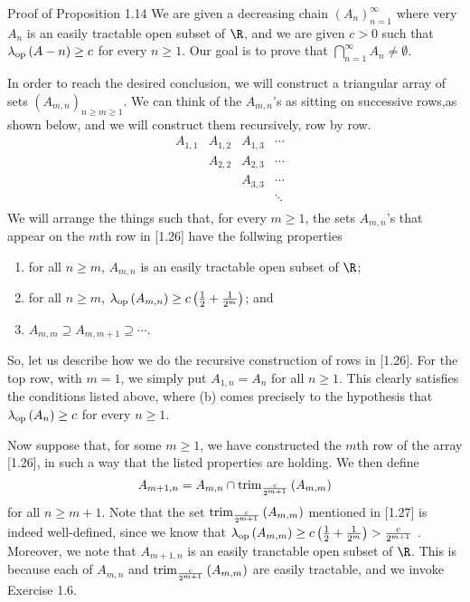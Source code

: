 \documentclass[pmath450]{subfiles}
\begin{document}
    \begin{boxyproof}{Proof of Proposition 1.14}
        We are given a decreasing chain $\left( A_{n} \right)^{\infty}_{n=1}$ where very $A_n$ is an easily tractable open subset of $\R$, and we are given $c>0$ such that $\lambda_{\operatorname{op}}\left( A-n \right)\geq c$ for every $n\geq 1$. Our goal is to prove that $\bigcap^{\infty}_{n=1}A_n\neq\emptyset$.

        In order to reach the desired conclusion, we will construct a triangular array of sets $\left( A_{m,n} \right)^{}_{n\geq m\geq 1}$. We can think of the $A_{m,n}$'s as sitting on successive rows,as shown below, and we will construct them recursively, row by row.
        \begin{equation}
            \begin{matrix}
                A_{1,1} & A_{1,2} & A_{1,3} & \cdots \\
                        & A_{2,2} & A_{2,3} & \cdots \\
                        &  &  A_{3,3} & \cdots \\
                        & & & \ddots & \\
            \end{matrix}
        \end{equation}
        We will arrange the things such that, for every $m\geq 1$, the sets $A_{m,n}$'s that appear on the $m$th row in [1.26] have the follwing properties
        \begin{enumerate}
            \item for all $n\geq m$, $A_{m,n}$ is an easily tractable open subset of $\R$;
            \item for all $n\geq m$, $\lambda_{\operatorname{op}}\left( A_{m,n} \right)\geq c\left( \frac{1}{2}+\frac{1}{2^m} \right)$; and
            \item $A_{m,m}\supseteq A_{m,m+1}\supseteq\cdots$.
        \end{enumerate}
        So, let us describe how we do the recursive construction of rows in [1.26]. For the top row, with $m=1$, we simply put $A_{1,n}=A_n$ for all $n\geq 1$. This clearly satisfies the conditions listed above, where (b) comes precisely to the hypothesis that $\lambda_{\operatorname{op}}\left( A_n \right)\geq c$ for every $n\geq 1$.

        Now suppose that, for some $m\geq 1$, we have constructed the $m$th row of the array [1.26], in such a way that the listed properties are holding. We then define
        \begin{equation}
            A_{m+1,n} = A_{m,n}\cap\operatorname{trim}_{\frac{c}{2^{m+1}}}\left( A_{m,m} \right)
        \end{equation}
        for all $n\geq m+1$. Note that the set $\operatorname{trim}_{\frac{c}{2^{m+1}}}\left( A_{m,m} \right)$ mentioned in [1.27] is indeed well-defined, since we know that $\lambda_{\operatorname{op}}\left( A_{m,m} \right)\geq c\left( \frac{1}{2}+\frac{1}{2^m} \right) > \frac{c}{2^{m+1}}$ . Moreover, we note that $A_{m+1,n}$ is an easily tranctable open subset of $\R$. This is because each of $A_{m,n}$ and $\operatorname{trim}_{\frac{c}{2^{m+1}}}\left( A_{m,m} \right)$ are easily tractable, and we invoke Exercise 1.6.


\end{boxyproof}
\end{document}
